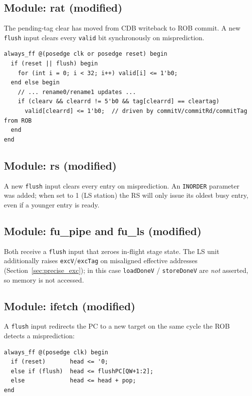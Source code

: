 \documentclass[11pt]{article}
\begin{document}
\subsection{Module: rat (modified)}

The pending-tag clear has moved from CDB writeback to ROB commit. A new
\texttt{flush} input clears every \texttt{valid} bit synchronously on
misprediction.

\begin{lstlisting}[style=verilog, caption=RAT writeback (commit-time clear + flush)]
always_ff @(posedge clk or posedge reset) begin
  if (reset || flush) begin
    for (int i = 0; i < 32; i++) valid[i] <= 1'b0;
  end else begin
    // ... rename0/rename1 updates ...
    if (clearv && clearrd != 5'b0 && tag[clearrd] == cleartag)
      valid[clearrd] <= 1'b0;  // driven by commitV/commitRd/commitTag from ROB
  end
end
\end{lstlisting}

\subsection{Module: rs (modified)}

A new \texttt{flush} input clears every entry on misprediction. An
\texttt{INORDER} parameter was added; when set to 1 (LS station) the RS will
only issue its oldest busy entry, even if a younger entry is ready.

\subsection{Module: fu\_pipe and fu\_ls (modified)}

Both receive a \texttt{flush} input that zeroes in-flight stage state. The LS
unit additionally raises \texttt{excV}/\texttt{excTag} on misaligned effective
addresses (Section~\ref{sec:precise_exc}); in this case \texttt{loadDoneV} /
\texttt{storeDoneV} are \emph{not} asserted, so memory is not accessed.

\subsection{Module: ifetch (modified)}

A \texttt{flush} input redirects the PC to a new target on the same cycle the
ROB detects a misprediction:

\begin{lstlisting}[style=verilog, caption=ifetch redirect on flush]
always_ff @(posedge clk) begin
  if (reset)       head <= '0;
  else if (flush)  head <= flushPC[QW+1:2];
  else             head <= head + pop;
end
\end{lstlisting}
\end{document}
